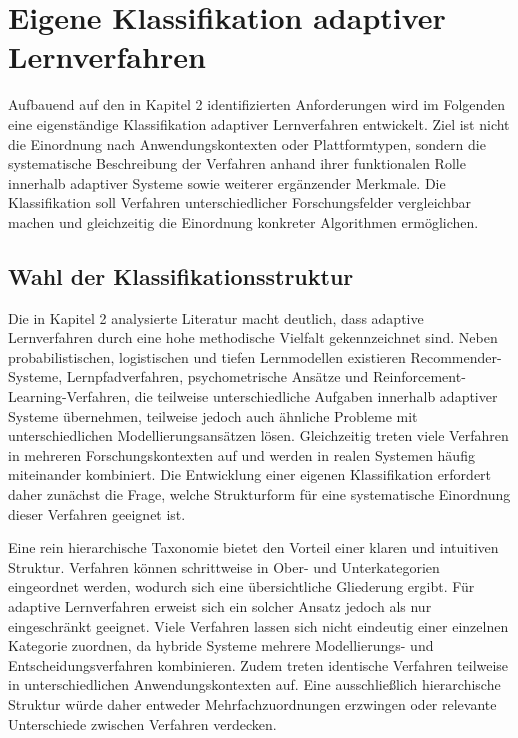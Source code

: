 
\chapter{Eigene Klassifikation adaptiver
Lernverfahren}\label{eigene-klassifikation-adaptiver-lernverfahren}

Aufbauend auf den in Kapitel 2 identifizierten Anforderungen wird im
Folgenden eine eigenständige Klassifikation adaptiver Lernverfahren
entwickelt. Ziel ist nicht die Einordnung nach Anwendungskontexten oder
Plattformtypen, sondern die systematische Beschreibung der Verfahren
anhand ihrer funktionalen Rolle innerhalb adaptiver Systeme sowie
weiterer ergänzender Merkmale. Die Klassifikation soll Verfahren
unterschiedlicher Forschungsfelder vergleichbar machen und gleichzeitig
die Einordnung konkreter Algorithmen ermöglichen.

\section{Wahl der
Klassifikationsstruktur}\label{wahl-der-klassifikationsstruktur}

Die in Kapitel 2 analysierte Literatur macht deutlich, dass adaptive
Lernverfahren durch eine hohe methodische Vielfalt gekennzeichnet sind.
Neben probabilistischen, logistischen und tiefen Lernmodellen existieren
Recommender-Systeme, Lernpfadverfahren, psychometrische Ansätze und
Reinforcement-Learning-Verfahren, die teilweise unterschiedliche
Aufgaben innerhalb adaptiver Systeme übernehmen, teilweise jedoch auch
ähnliche Probleme mit unterschiedlichen Modellierungsansätzen lösen.
Gleichzeitig treten viele Verfahren in mehreren Forschungskontexten auf
und werden in realen Systemen häufig miteinander kombiniert. Die
Entwicklung einer eigenen Klassifikation erfordert daher zunächst die
Frage, welche Strukturform für eine systematische Einordnung dieser
Verfahren geeignet ist.

Eine rein hierarchische Taxonomie bietet den Vorteil einer klaren und
intuitiven Struktur. Verfahren können schrittweise in Ober- und
Unterkategorien eingeordnet werden, wodurch sich eine übersichtliche
Gliederung ergibt. Für adaptive Lernverfahren erweist sich ein solcher
Ansatz jedoch als nur eingeschränkt geeignet. Viele Verfahren lassen
sich nicht eindeutig einer einzelnen Kategorie zuordnen, da hybride
Systeme mehrere Modellierungs- und Entscheidungsverfahren kombinieren.
Zudem treten identische Verfahren teilweise in unterschiedlichen
Anwendungskontexten auf. Eine ausschließlich hierarchische Struktur
würde daher entweder Mehrfachzuordnungen erzwingen oder relevante
Unterschiede zwischen Verfahren verdecken.

